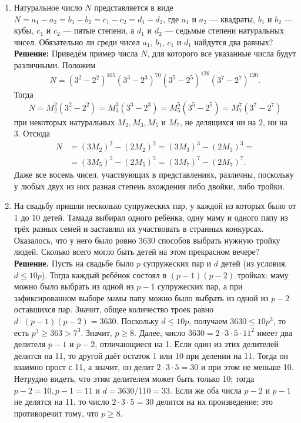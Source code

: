 \documentclass[a4paper,12pt]{article}
\begin{document}
\begin{enumerate}[label=\textbf{Задача \arabic*.}]
\item Натуральное число $N$ представляется в виде $N = a_1 - a_2 = b_1 - b_2 = c_1 - c_2 = d_1 - d_2$, где $a_1$ и $a_2$ --- квадраты, $b_1$ и $b_2$ --- кубы, $c_1$ и $c_2$ --- пятые степени, а $d_1$ и $d_2$ --- седьмые степени натуральных чисел. Обязательно ли среди чисел $a_1$, $b_1$, $c_1$ и $d_1$ найдутся два равных? \\
\textbf{Решение:} Приведём пример числа $N$, для которого все указанные числа будут различными. Положим
\[ N = (3^2-2^2)^{105}(3^3-2^3)^{70}(3^5-2^5)^{126}(3^7-2^7)^{120}. \]
Тогда
\[ N = M_2^2(3^2-2^2) = M_3^3(3^3-2^3) = M_5^5(3^5-2^5) = M_7^7(3^7-2^7) \]
при некоторых натуральных $M_2, M_3, M_5$ и $M_7$, не делящихся ни на 2, ни на 3. Отсюда
\begin{align*}
N &= (3M_2)^2 - (2M_2)^2 = (3M_3)^3 - (2M_3)^3 = \\
  &= (3M_5)^5 - (2M_5)^5 = (3M_7)^7 - (2M_7)^7.
\end{align*}
Даже все восемь чисел, участвующих в представлениях, различны, поскольку у любых двух из них разная степень вхождения либо двойки, либо тройки.

\item На свадьбу пришли несколько супружеских пар, у каждой из которых было от 1 до 10 детей. Тамада выбирал одного ребёнка, одну маму и одного папу из трёх разных семей и заставлял их участвовать в странных конкурсах. Оказалось, что у него было ровно 3630 способов выбрать нужную тройку людей. Сколько всего могло быть детей на этом прекрасном вечере? \\
\textbf{Решение.} Пусть на свадьбе было $p$ супружеских пар и $d$ детей (из условия, $d \le 10p$). Тогда каждый ребёнок состоял в $(p-1)(p-2)$ тройках: маму можно было выбрать из одной из $p-1$ супружеских пар, а при зафиксированном выборе мамы папу можно было выбрать из одной из $p-2$ оставшихся пар. Значит, общее количество троек равно $d \cdot (p-1)(p-2) = 3630$.
Поскольку $d \le 10p$, получаем $3630 \le 10p^3$, то есть $p^3 \ge 363 > 7^3$. Значит, $p \ge 8$.
Далее, число $3630 = 2 \cdot 3 \cdot 5 \cdot 11^2$ имеет два делителя $p-1$ и $p-2$, отличающиеся на 1. Если один из этих делителей делится на 11, то другой даёт остаток 1 или 10 при делении на 11. Тогда он взаимно прост с 11, а значит, он делит $2 \cdot 3 \cdot 5 = 30$ и при этом не меньше 10. Нетрудно видеть, что этим делителем может быть только 10; тогда $p-2 = 10, p-1 = 11$ и $d = 3630/110 = 33$.
Если же оба числа $p-2$ и $p-1$ не делятся на 11, то число $2 \cdot 3 \cdot 5 = 30$ делится на их произведение; это противоречит тому, что $p \ge 8$.


\end{enumerate}
\end{document}
